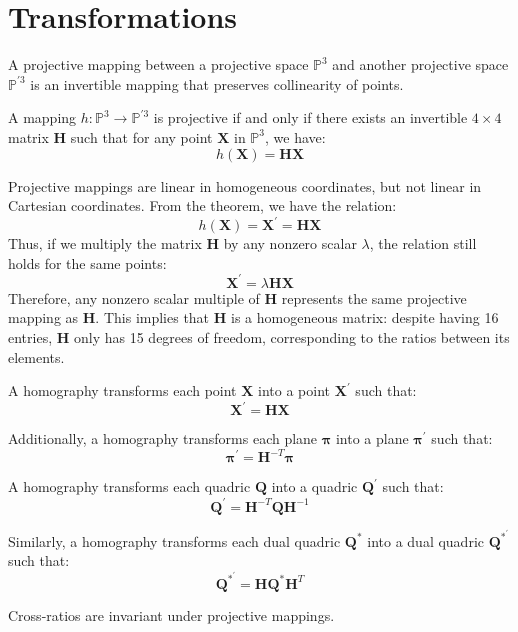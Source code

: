 \section{Transformations}

\begin{definition}
    A projective mapping between a projective space $\mathbb{P}^3$ and another projective space $\mathbb{P}^{\prime 3}$ is an invertible mapping that preserves collinearity of points.
\end{definition}

\begin{theorem}
    A mapping $h : \mathbb{P}^3 \rightarrow \mathbb{P}^{\prime 3}$ is projective if and only if there exists an invertible $4 \times 4$ matrix $\mathbf{H}$ such that for any point $\mathbf{X}$ in $\mathbb{P}^3$, we have:
    \[h(\mathbf{X}) = \mathbf{H}\mathbf{X}\]
\end{theorem}

Projective mappings are linear in homogeneous coordinates, but not linear in Cartesian coordinates. 
From the theorem, we have the relation:
\[h(\mathbf{X}) = \mathbf{X}^\prime = \mathbf{H} \mathbf{X}\]
Thus, if we multiply the matrix $\mathbf{H}$ by any nonzero scalar $\lambda$, the relation still holds for the same points:
\[\mathbf{X}^\prime = \lambda \mathbf{H} \mathbf{X}\]
Therefore, any nonzero scalar multiple of $\mathbf{H}$ represents the same projective mapping as $\mathbf{H}$. 
This implies that $\mathbf{H}$ is a homogeneous matrix: despite having 16 entries, $\mathbf{H}$ only has 15 degrees of freedom, corresponding to the ratios between its elements.

A homography transforms each point $\mathbf{X}$ into a point $\mathbf{X}^\prime$ such that:
\[\mathbf{X}^\prime = \mathbf{H} \mathbf{X}\]

Additionally, a homography transforms each plane $\boldsymbol{\pi}$ into a plane $\boldsymbol{\pi}^\prime$ such that:
\[\boldsymbol{\pi}^\prime = \mathbf{H}^{-T} \boldsymbol{\pi}\]

A homography transforms each quadric $\mathbf{Q}$ into a quadric $\mathbf{Q}^\prime$ such that:
\[\mathbf{Q}^\prime = \mathbf{H}^{-T} \mathbf{Q} \mathbf{H}^{-1}\]

Similarly, a homography transforms each dual quadric $\mathbf{Q}^*$ into a dual quadric $\mathbf{Q}^{*^\prime}$ such that:
\[\mathbf{Q}^{*^\prime} = \mathbf{H} \mathbf{Q}^* \mathbf{H}^T\]

Cross-ratios are invariant under projective mappings.

